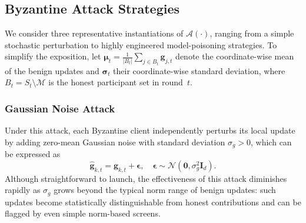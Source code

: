 \documentclass[journal]{IEEEtran}
\begin{document}
\subsection{Byzantine Attack Strategies}

We consider three representative instantiations of $\mathcal{A}(\cdot)$, ranging from a simple stochastic perturbation to highly engineered model-poisoning strategies. To simplify the exposition, let $\boldsymbol{\mu}_t = \frac{1}{|B_t|} \sum_{j \in B_t} \mathbf{g}_{j,t}$ denote the coordinate-wise mean of the benign updates and $\boldsymbol{\sigma}_t$ their coordinate-wise standard deviation, where $B_t = S_t \setminus \mathcal{M}$ is the honest participant set in round~$t$.

\subsubsection{Gaussian Noise Attack}
Under this attack, each Byzantine client independently perturbs its local update by adding zero-mean Gaussian noise with standard deviation $\sigma_g > 0$, which can be expressed as
\begin{equation}
\hat{\mathbf{g}}_{k,t} = \mathbf{g}_{k,t} + \boldsymbol{\epsilon}, \quad \boldsymbol{\epsilon} \sim \mathcal{N}(\mathbf{0}, \sigma_g^2 \mathbf{I}_d).
\label{eq:gaussian_attack}
\end{equation}
Although straightforward to launch, the effectiveness of this attack diminishes rapidly as $\sigma_g$ grows beyond the typical norm range of benign updates: such updates become statistically distinguishable from honest contributions and can be flagged by even simple norm-based screens.
\end{document}

